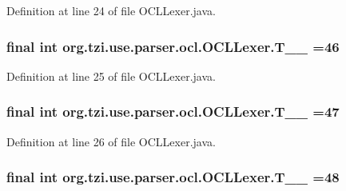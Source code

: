 Definition at line 24 of file O\-C\-L\-Lexer.\-java.

\hypertarget{classorg_1_1tzi_1_1use_1_1parser_1_1ocl_1_1_o_c_l_lexer_aee0443f28dc5b40a880b8f8db06fccf8}{
\subsubsection[{T\-\_\-\-\_\-46}]{\setlength{\rightskip}{0pt plus 5cm}final int org.\-tzi.\-use.\-parser.\-ocl.\-O\-C\-L\-Lexer.\-T\-\_\-\-\_ =46\hspace{0.3cm}{\ttfamily [static]}}}\label{classorg_1_1tzi_1_1use_1_1parser_1_1ocl_1_1_o_c_l_lexer_aee0443f28dc5b40a880b8f8db06fccf8}


Definition at line 25 of file O\-C\-L\-Lexer.\-java.

\hypertarget{classorg_1_1tzi_1_1use_1_1parser_1_1ocl_1_1_o_c_l_lexer_abf4417019f1732309d3c8ffc351c0c67}{
\subsubsection[{T\-\_\-\-\_\-47}]{\setlength{\rightskip}{0pt plus 5cm}final int org.\-tzi.\-use.\-parser.\-ocl.\-O\-C\-L\-Lexer.\-T\-\_\-\-\_ =47\hspace{0.3cm}{\ttfamily [static]}}}\label{classorg_1_1tzi_1_1use_1_1parser_1_1ocl_1_1_o_c_l_lexer_abf4417019f1732309d3c8ffc351c0c67}


Definition at line 26 of file O\-C\-L\-Lexer.\-java.

\hypertarget{classorg_1_1tzi_1_1use_1_1parser_1_1ocl_1_1_o_c_l_lexer_a1bb9f6876ba924b1a547d8f9a47b1018}{
\subsubsection[{T\-\_\-\-\_\-48}]{\setlength{\rightskip}{0pt plus 5cm}final int org.\-tzi.\-use.\-parser.\-ocl.\-O\-C\-L\-Lexer.\-T\-\_\-\-\_ =48\hspace{0.3cm}{\ttfamily [static]}}}\label{classorg_1_1tzi_1_1use_1_1parser_1_1ocl_1_1_o_c_l_lexer_a1bb9f6876ba924b1a547d8f9a47b1018}


